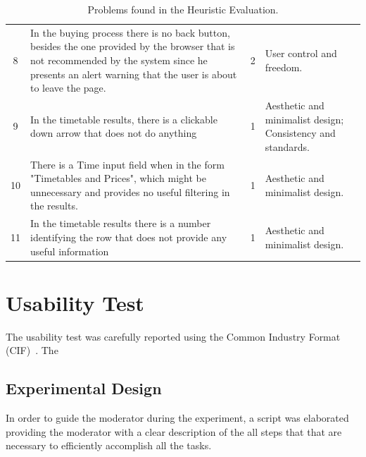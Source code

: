 \documentclass[a4paper]{article}
\begin{document}
\begin{table}[h]
\begin{center}
\begin{tabular}{c | p{8cm} | c | p{4.5cm}}
8 & In the buying process there is no back button, besides the one provided by the browser that is not recommended by the system since he presents an alert warning that the user is about to leave the page. & \cellcolor{orange!20}2 & User control and freedom.\\

9  &  In the timetable results, there is a clickable down arrow that does not do anything  & \cellcolor{yellow!10} 1 &  Aesthetic and minimalist design; Consistency and standards.  \\

	10  &  There is a Time input field when in the form "Timetables and Prices", which might be unnecessary and provides no useful filtering in the results.  & \cellcolor{yellow!10} 1 &  Aesthetic and minimalist design.  \\
	
		11 &  In the timetable results there is a number identifying the row that does not provide any useful information & \cellcolor{yellow!10} 1 & Aesthetic and minimalist design.\\
	
\hline
\end{tabular}
\end{center}
\caption{Problems found in the Heuristic Evaluation.}
\label{tab:heuristic_results}
\end{table}


\section{Usability Test}

The usability test was carefully reported using the Common Industry Format (CIF)~\citep{iusr2006cif}. The 

\subsection{Experimental Design}

In order to guide the moderator during the experiment, a script was elaborated providing the moderator with a clear description of the all steps that that are necessary to efficiently accomplish all the tasks.

\end{document}
